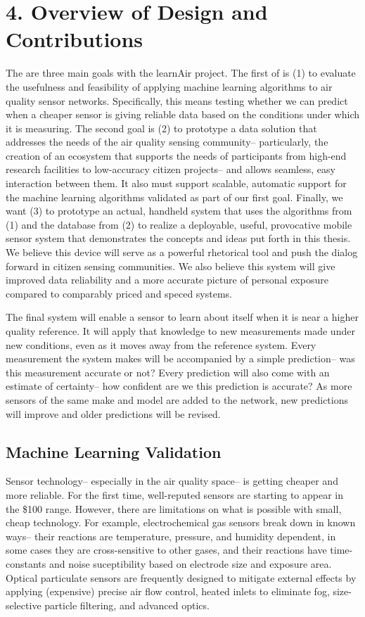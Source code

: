\chapter{4. Overview of Design and Contributions}

The are three main goals with the learnAir project.  The first of is (1) to evaluate the usefulness and feasibility of applying machine learning algorithms to air quality sensor networks.  Specifically, this means testing whether we can predict when a cheaper sensor is giving reliable data based on the conditions under which it is measuring. The second goal is (2) to prototype a data solution that addresses the needs of the air quality sensing community-- particularly, the creation of an ecosystem that supports the needs of participants from high-end research facilities to low-accuracy citizen projects-- and allows seamless, easy interaction between them.  It also must support scalable, automatic support for the machine learning algorithms validated as part of our first goal.  Finally, we want (3) to prototype an actual, handheld system that uses the algorithms from (1) and the database from (2) to realize a deployable, useful, provocative mobile sensor system that demonstrates the concepts and ideas put forth in this thesis.  We believe this device will serve as a powerful rhetorical tool and push the dialog forward in citizen sensing communities.  We also believe this system will give improved data reliability and a more accurate picture of personal exposure compared to comparably priced and speced systems.      

The final system will enable a sensor to learn about itself when it is near a higher quality reference.  It will apply that knowledge to new measurements made under new conditions, even as it moves away from the reference system.  Every measurement the system makes will be accompanied by a simple prediction-- was this measurement accurate or not?  Every prediction will also come with an estimate of certainty-- how confident are we this prediction is accurate?  As more sensors of the same make and model are added to the network, new predictions will improve and older predictions will be revised.

\section{Machine Learning Validation}

Sensor technology-- especially in the air quality space-- is getting cheaper and more reliable.  For the first time, well-reputed sensors are starting to appear in the \$100 range.  However, there are limitations on what is possible with small, cheap technology.  For example, electrochemical gas sensors break down in known ways-- their reactions are temperature, pressure, and humidity dependent, in some cases they are cross-sensitive to other gases, and their reactions have time-constants and noise suceptibility based on electrode size and exposure area.  Optical particulate sensors are frequently designed to mitigate external effects by applying (expensive) precise air flow control, heated inlets to eliminate fog, size-selective particle filtering, and advanced optics.

